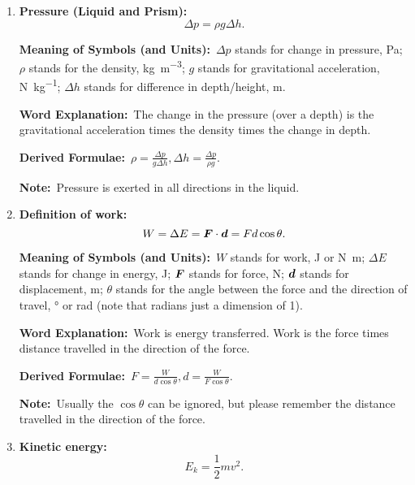 \documentclass[8pt]{article}
\newcommand{\MeanSymb}{\textbf{Meaning of Symbols (and Units):}\ }
\newcommand{\WordExpl}{\textbf{Word Explanation:}\ }
\newcommand{\DeriForm}{\textbf{Derived Formulae:}\ }
\newcommand{\Note}{\textbf{Note:}\ }
\begin{document}
\begin{enumerate}
                \DeriForm \(F = pA, A = \frac{F}{p}\).

                \Note Though force is a vector, pressure is a scalar. This will be more significant in the next formula.

                \item \textbf{Pressure (Liquid and Prism):}
                \[
                    \Delta p = \rho g \Delta h.
                \]

                \MeanSymb \(\Delta p\) stands for change in pressure, \unit{\pascal}; \(\rho\) stands for the density, \unit{\kilogram\per\metre\cubed}; \(g\) stands for gravitational acceleration, \unit{\newton \per \kilogram}; \(\Delta h\) stands for difference in depth/height, \unit{\metre}.

                \WordExpl The change in the pressure (over a depth) is the gravitational acceleration times the density times the change in depth.

                \DeriForm \(\rho = \frac{\Delta p}{g \Delta h}, \Delta h = \frac{\Delta p}{\rho g}\).

                \Note Pressure is exerted in all directions in the liquid.

                \item \textbf{Definition of work:}
                \[
                    W = \Delta E = \boldsymbol{F} \cdot \boldsymbol{d} = Fd \cos \theta.
                \]

                \MeanSymb \(W\) stands for work, \unit{\joule} or \unit{\newton \metre}; \(\Delta E\) stands for change in energy, \unit{\joule}; \(\boldsymbol{F}\) stands for force, \unit{\newton}; \(\boldsymbol{d}\) stands for displacement, \unit{\metre}; \(\theta\) stands for the angle between the force and the direction of travel, \unit{\degree} or \unit{\radian} (note that radians just a dimension of 1).

                \WordExpl Work is energy transferred. Work is the force times distance travelled in the direction of the force.

                \DeriForm \(F = \frac{W}{d \cos \theta}, d = \frac{W}{F \cos \theta}\).

                \Note Usually the \(\cos \theta\) can be ignored, but please remember the distance travelled in the direction of the force.

                \item \textbf{Kinetic energy:}
                \[
                    E_k = \frac{1}{2} m v^2.
                \]


\end{enumerate}
\end{document}

